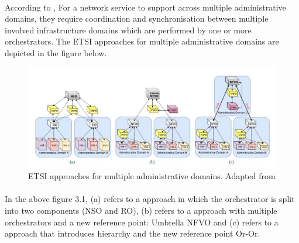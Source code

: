 \paragraph{}According to \cite{de2018network} , For a network service to support across multiple administrative domains, they require coordination and synchronisation between multiple involved infrastructure domains which are performed by one or more orchestrators. The ETSI approaches for multiple administrative domains are depicted in the figure below.

\begin{figure}
	\centering
	\includegraphics[width=0.8\linewidth]{"figures/ETSI approaches"}
	\caption{ETSI approaches for multiple administrative domains. Adapted from \cite{de2018network}}
	\label{fig:etsi-approaches}
\end{figure}


\paragraph{}In the above figure 3.1, (a) refers to a approach in which the orchestrator is split into two components (NSO and RO), (b) refers to a approach with multiple orchestrators and a new reference point: Umbrella NFVO and (c) refers to a approach that introduces hierarchy and the new reference point Or-Or.